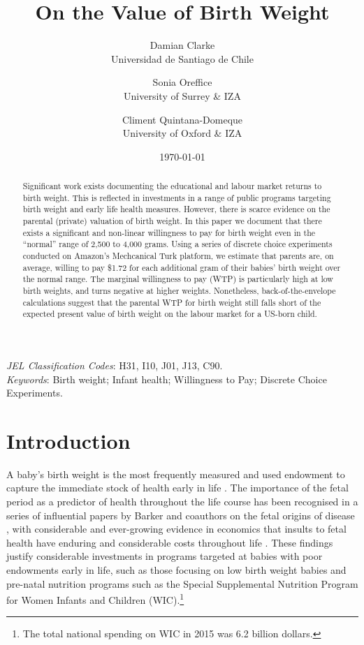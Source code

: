 \documentclass[a4paper, 11pt]{article}
\title{On the Value of Birth Weight}
\author{\small{Damian Clarke} \\ \small{Universidad de Santiago de Chile} \and \small{Sonia Oreffice} \\ \small{University of Surrey \& IZA}  \and \small{Climent Quintana-Domeque} \\ \small{University of Oxford \& IZA}}
\date{\today}
\begin{document}
\begin{spacing}{1.4}
\maketitle

\begin{abstract}
  Significant work exists documenting the educational and labour market returns
  to birth weight.  This is reflected in investments in a range of public
  programs targeting birth weight and early life health measures.  However,
  there is scarce evidence on the parental (private) valuation of birth
  weight.  In this paper we document that there exists a significant and non-linear
  willingness to pay for birth weight even in the ``normal'' range of
  2,500 to 4,000 grams.  Using a series of discrete choice experiments conducted
  on Amazon's Mechcanical Turk platform, we
  estimate that parents are, on average, willing to pay \$1.72 for each
  additional gram of their babies' birth weight over the normal range.  The
  marginal willingness to pay (WTP) is particularly high at low birth weights,
  and turns negative at higher weights.  Nonetheless, back-of-the-envelope
  calculations suggest that the parental WTP for birth weight still falls short
  of the expected present value of birth weight on the labour market for a
  US-born child.
\end{abstract}
\emph{JEL Classification Codes}: H31, I10, J01, J13, C90.\\
\emph{Keywords}: Birth weight; Infant health; Willingness to Pay; Discrete
Choice Experiments.

\newpage
\section{Introduction}
A baby's birth weight is the most frequently measured and used endowment to
capture the immediate stock of health early in life \citep{AlmondCurrie2011}.
The importance of the fetal period as a predictor of health throughout the life
course has been recognised in a series of influential papers by Barker and
coauthors on the fetal origins of disease \citep{Barkeretal1989,Barker1990,
  Barker1995}, with considerable and ever-growing evidence in economics that
insults to fetal
health have enduring and considerable costs throughout life \citep{Almond2006,
  CurrieMoretti2007,Caseetal2005,Almondetal2009,Blacketal2007}.
These findings justify considerable investments in programs targeted at
babies with poor endowments early in life, such as those focusing on low birth
weight babies \citep{Almondetal2005,Bharadwajetal2013} and pre-natal nutrition
programs such as the Special Supplemental Nutrition Program for Women Infants
and Children (WIC).\footnote{The total national spending on WIC in 2015 was 6.2
billion dollars.}


\end{spacing}
\end{document}
